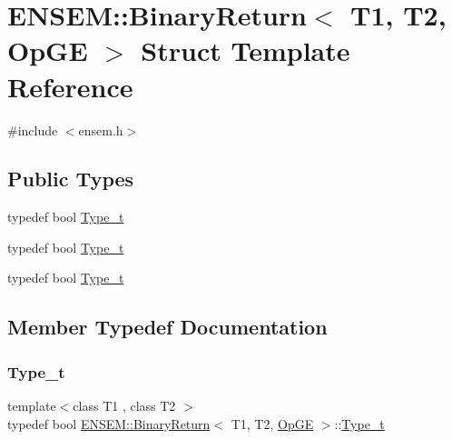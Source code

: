 \hypertarget{structENSEM_1_1BinaryReturn_3_01T1_00_01T2_00_01OpGE_01_4}{}\section{E\+N\+S\+EM\+:\+:Binary\+Return$<$ T1, T2, Op\+GE $>$ Struct Template Reference}
\label{structENSEM_1_1BinaryReturn_3_01T1_00_01T2_00_01OpGE_01_4}


{\ttfamily \#include $<$ensem.\+h$>$}

\subsection*{Public Types}
\begin{DoxyCompactItemize}
\item 
typedef bool \mbox{\hyperlink{structENSEM_1_1BinaryReturn_3_01T1_00_01T2_00_01OpGE_01_4_a8b2ef4a5b38d3f7cb5dc26a1fb4bdb89}{Type\+\_\+t}}
\item 
typedef bool \mbox{\hyperlink{structENSEM_1_1BinaryReturn_3_01T1_00_01T2_00_01OpGE_01_4_a8b2ef4a5b38d3f7cb5dc26a1fb4bdb89}{Type\+\_\+t}}
\item 
typedef bool \mbox{\hyperlink{structENSEM_1_1BinaryReturn_3_01T1_00_01T2_00_01OpGE_01_4_a8b2ef4a5b38d3f7cb5dc26a1fb4bdb89}{Type\+\_\+t}}
\end{DoxyCompactItemize}


\subsection{Member Typedef Documentation}
\mbox{\label{structENSEM_1_1BinaryReturn_3_01T1_00_01T2_00_01OpGE_01_4_a8b2ef4a5b38d3f7cb5dc26a1fb4bdb89}} 
\subsubsection{\texorpdfstring{Type\_t}{Type\_t}\hspace{0.1cm}{\footnotesize\ttfamily [1/3]}}
{\footnotesize\ttfamily template$<$class T1 , class T2 $>$ \\
typedef bool \mbox{\hyperlink{structENSEM_1_1BinaryReturn}{E\+N\+S\+E\+M\+::\+Binary\+Return}}$<$ T1, T2, \mbox{\hyperlink{structENSEM_1_1OpGE}{Op\+GE}} $>$\+::\mbox{\hyperlink{structENSEM_1_1BinaryReturn_3_01T1_00_01T2_00_01OpGE_01_4_a8b2ef4a5b38d3f7cb5dc26a1fb4bdb89}{Type\+\_\+t}}}

